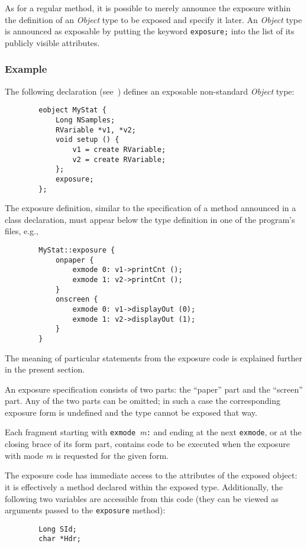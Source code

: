 As for a regular method, it is possible to merely announce the
exposure within the definition of an {\em Object\/} type to be exposed and
specify it later.
An {\em Object\/} type is announced as exposable by putting the keyword
{\tt exposure;} into the list of its publicly visible attributes.

\subsubsection*{Example}

\noindent
The following declaration (see~)
defines an exposable non-standard {\em Object\/} type:
\begin{verbatim}
        eobject MyStat {
            Long NSamples;
            RVariable *v1, *v2;
            void setup () {
                v1 = create RVariable;
                v2 = create RVariable;
            };
            exposure;
        };
\end{verbatim}

The exposure definition, similar to the specification of a method announced
in a class declaration, must appear below the type definition in one of the
program's files, e.g.,
\begin{verbatim}
        MyStat::exposure {
            onpaper {
                exmode 0: v1->printCnt ();
                exmode 1: v2->printCnt ();
            }
            onscreen {
                exmode 0: v1->displayOut (0);
                exmode 1: v2->displayOut (1);
            }
        }
\end{verbatim}
The meaning of particular statements from the exposure code is explained
further in the present section.

\medskip

\noindent
An exposure specification consists of two parts: the ``paper'' part and the
``screen'' part.
Any of the two parts can be omitted; in such a case the corresponding
exposure form is undefined and the type cannot be exposed that way.

Each fragment starting with {\tt exmode~}{\em m\/}{\tt:}
and ending at the next {\tt exmode},
or at the closing brace of its form part, contains code to be executed when
the exposure with mode {\em m\/} is requested for the given form.

The exposure code has immediate access to the attributes of
the exposed object: it is effectively a method declared within
the exposed type.
Additionally, the following two variables are accessible from this code (they
can be viewed as arguments passed to the {\tt exposure} method):
\begin{verbatim}
        Long SId;
        char *Hdr;
\end{verbatim}

